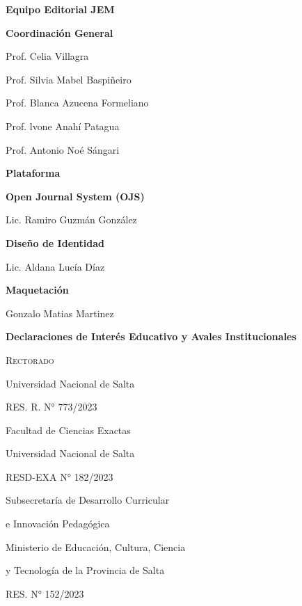 \begin{center}
	\LARGE \bfseries \sffamily Equipo Editorial JEM
\end{center}

\begin{center}
	\sffamily \Large \bfseries Coordinación General
	
	\bigskip
	
	\normalfont \large
	Prof. Celia Villagra
	
	Prof. Silvia Mabel Baspiñeiro
	
	Prof. Blanca Azucena Formeliano
	
	Prof. lvone Anahí Patagua
	
	Prof. Antonio Noé Sángari
\end{center}

\vspace*{2.5mm}

\begin{center}
	\sffamily \Large \bfseries Plataforma
	
	\bigskip
	
	\sffamily \large \bfseries Open Journal System (OJS)
	
	\normalfont \large
	Lic. Ramiro Guzmán González
	
	\bigskip
	
	\sffamily \large \bfseries Diseño de Identidad
	
	\normalfont \large
	Lic. Aldana Lucía Díaz
	
	\bigskip
	
	\sffamily \large \bfseries Maquetación 
	
	\normalfont \large
	Gonzalo Matias Martinez
\end{center}

\vspace*{5mm}

\begin{center}
	\sffamily \Large \bfseries Declaraciones de Interés Educativo y Avales Institucionales
	
	\bigskip
	
	\normalfont \normalsize \scshape
	Rectorado
	
	Universidad Nacional de Salta
	
	RES. R. N° 773/2023
	
	\bigskip
	
	Facultad de Ciencias Exactas 
	
	Universidad Nacional de Salta
	
	RESD-EXA N° 182/2023
	
	\bigskip
	
	Subsecretaría de Desarrollo Curricular
	
	e Innovación Pedagógica
	
	Ministerio de Educación, Cultura, Ciencia 
	
	y Tecnología de la Provincia de Salta
	
	RES. N° 152/2023
	
\end{center}